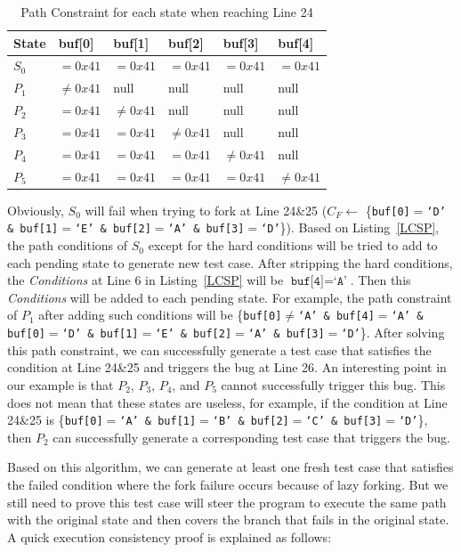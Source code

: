 \begin{table}
  \caption{\label{table:path-conditions}Path Constraint for each state when reaching Line 24}
  \centering
	\begin{tabular}{p{2cm}<{\centering} p{1.5cm}<{\centering} p{1.5cm}<{\centering} p{1.5cm}<{\centering} p{1.5cm}<{\centering} p{1.5cm}<{\centering}}
		\toprule
		State  & buf[0] & buf[1] & buf[2] & buf[3] & buf[4]\\ 
		\midrule
		$S_0$  &  $=0x41$ & $=0x41$ & $=0x41$ & $=0x41$ & $=0x41$ \\
		$P_1$  &  $\neq0x41$ & null & null & null & null \\
		$P_2$  &  $=0x41$ & $\neq0x41$ & null & null & null\\
		$P_3$  &  $=0x41$ & $=0x41$ & $\neq0x41$ & null & null \\
		$P_4$  &  $=0x41$ & $=0x41$ & $=0x41$ & $\neq0x41$ & null \\
		$P_5$  &  $=0x41$ & $=0x41$ & $=0x41$ & $=0x41$ & $\neq0x41$ \\
		\bottomrule
	\end{tabular}
\end{table}

Obviously, $S_0$ will fail when trying to fork at Line 24\&25 ($C_{F}\leftarrow$ \{\texttt{buf[0]$=$`D' \& buf[1]$=$`E' \& buf[2]$=$`A' \& buf[3]$=$`D'}\}). Based on Listing~\ref{LCSP}, the path conditions of $S_0$ except for the hard conditions will be tried to add to each pending state to generate new test case. 
After stripping the hard conditions, the \textit{Conditions} at Line 6 in Listing~\ref{LCSP} will be $\texttt{buf[4]}=\texttt{`A'}$. Then this \textit{Conditions} will be added to each pending state. For example, the path constraint of $P_1$ after adding such conditions will be \{\texttt{buf[0]$\neq$`A' \& buf[4]$=$`A' \& buf[0]$=$`D' \& buf[1]$=$`E' \& buf[2]$=$`A' \& buf[3]$=$`D'}\}. After solving this path constraint, we can successfully generate a test case that satisfies the condition at Line 24\&25 and triggers the bug at Line 26. 
An interesting point in our example is that $P_2$, $P_3$, $P_4$, and $P_5$ cannot successfully trigger this bug. This does not mean that these states are useless, for example, if the condition at Line 24\&25 is \{\texttt{buf[0]$=$`A' \& buf[1]$=$`B' \& buf[2]$=$`C' \& buf[3]$=$`D'}\}, then $P_2$ can successfully generate a corresponding test case that triggers the bug.

Based on this algorithm, we can generate at least one fresh test case that satisfies the failed condition where the fork failure occurs because of lazy forking. But we still need to prove this test case will steer the program to execute the same path with the original state and then covers the branch that fails in the original state. A quick execution consistency proof is explained as follows:

